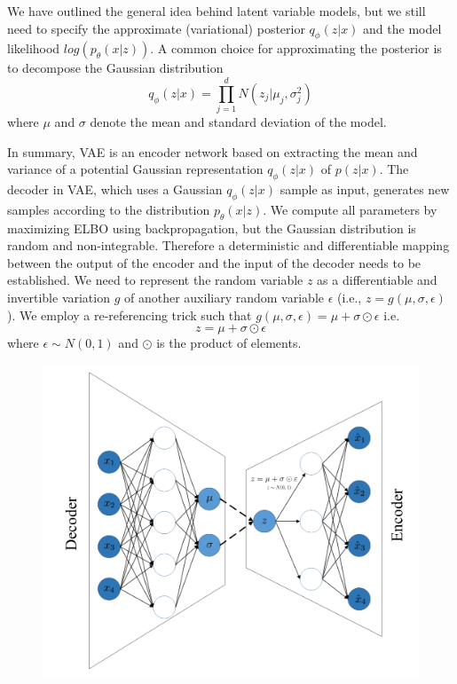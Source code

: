 \documentclass[%
reprint,
amsmath,amssymb,
aps,
]{revtex4-2}
\begin{document}
	We have outlined the general idea behind latent variable models, but we still need to specify the approximate (variational) posterior $q_{\phi}(z|x)$ and the model likelihood $log(p_{\theta}(x|z))$. A common choice for approximating the posterior is to decompose the Gaussian distribution
	\begin{equation}\label{prop}
		q_{\phi}(z|x) = \prod^d_{j=1} N(z_j|\mu_j,\sigma_j^2)
	\end{equation}
	where $\mu$ and $\sigma$ denote the mean and standard deviation of the model.
	
	In summary, VAE is an encoder network based on extracting the mean and variance of a potential Gaussian representation $q_{\phi}(z|x)$ of $p(z|x)$. The decoder in VAE, which uses a Gaussian $q_{\phi}(z|x)$ sample as input, generates new samples according to the distribution $p_{\theta}(x|z)$. We compute all parameters by maximizing ELBO using backpropagation, but the Gaussian distribution is random and non-integrable. Therefore a deterministic and differentiable mapping between the output of the encoder and the input of the decoder needs to be established. We need to represent the random variable $z$ as a differentiable and invertible variation $g$ of another auxiliary random variable $\epsilon$ (i.e., $z = g(\mu,\sigma,\epsilon)$). We employ a re-referencing trick such that $g(\mu,\sigma,\epsilon) = \mu + \sigma \odot \epsilon$ i.e.
	\begin{equation}\label{reparam}
		z  = \mu + \sigma \odot \epsilon
	\end{equation}
	where $\epsilon \sim N(0,1)$ and $\odot$ is the product of elements.
	
	\begin{figure}
		\centering
		\includegraphics[scale=0.25]{vae_style2}
		\caption{}
		\label{fig:vaestyle2}
	\end{figure}
	
\end{document}
